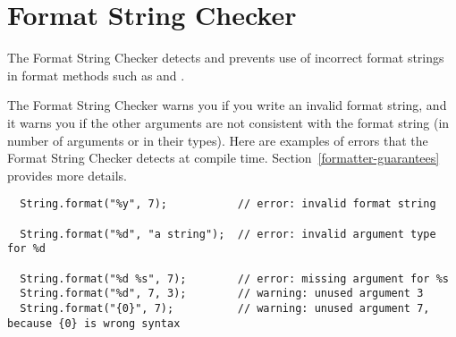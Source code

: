 \htmlhr
\chapter{Format String Checker\label{formatter-checker}}

The Format String Checker detects and prevents use of incorrect format strings
in format methods such as 
and .

The Format String Checker warns you if you write an invalid format string,
and it warns you if the other arguments are not consistent with the format
string (in number of arguments or in their types).  Here are examples of
errors that the Format String Checker detects at compile time.
Section~\ref{formatter-guarantees} provides more details.



% 
%

\begin{Verbatim}
  String.format("%y", 7);           // error: invalid format string

  String.format("%d", "a string");  // error: invalid argument type for %d

  String.format("%d %s", 7);        // error: missing argument for %s
  String.format("%d", 7, 3);        // warning: unused argument 3
  String.format("{0}", 7);          // warning: unused argument 7, because {0} is wrong syntax
\end{Verbatim}



